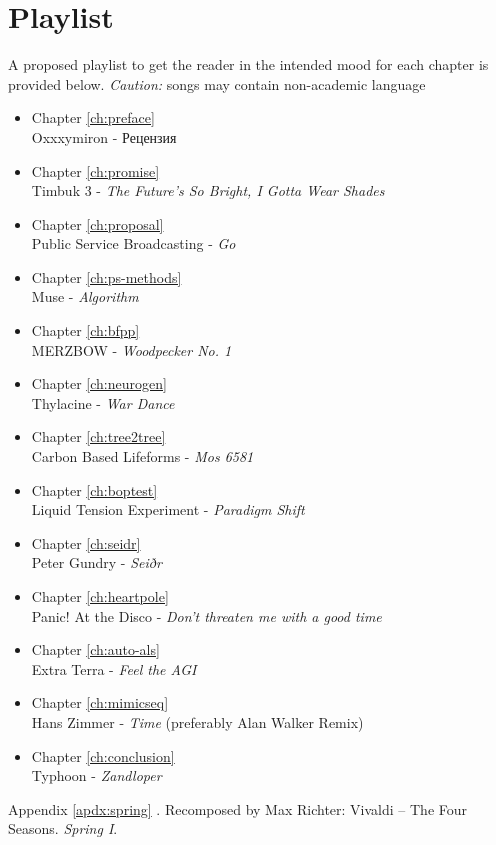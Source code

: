 \chapter{Playlist}
\label{apdx:playlist}

A proposed playlist to get the reader in the intended mood for each chapter is provided below.
\emph{Caution:} songs may contain non-academic language

\begin{itemize}
    \item Chapter \ref{ch:preface}  \\ Oxxxymiron - \foreignlanguage{russian}{Рецензия}
    \item Chapter \ref{ch:promise}  \\ Timbuk 3 - \emph{The Future's So Bright, I Gotta Wear Shades}
    \item Chapter \ref{ch:proposal}  \\ Public Service Broadcasting - \emph{Go}
    \item Chapter \ref{ch:ps-methods}  \\ Muse - \emph{Algorithm}
    \item Chapter \ref{ch:bfpp}  \\ MERZBOW - \emph{Woodpecker No. 1} 
    \item Chapter \ref{ch:neurogen}  \\ Thylacine - \emph{War Dance}
    \item Chapter \ref{ch:tree2tree}  \\ Carbon Based Lifeforms - \emph{Mos 6581}
    \item Chapter \ref{ch:boptest}  \\ Liquid Tension Experiment - \emph{Paradigm Shift}
    \item Chapter \ref{ch:seidr}  \\ Peter Gundry - \emph{Seiðr}
    \item Chapter \ref{ch:heartpole}  \\ Panic! At the Disco - \emph{Don't threaten me with a good time}
    \item Chapter \ref{ch:auto-als}  \\ Extra Terra - \emph{Feel the AGI} 
    \item Chapter \ref{ch:mimicseq}  \\ Hans Zimmer - \emph{Time} (preferably Alan Walker Remix)
    \item Chapter \ref{ch:conclusion}  \\ Typhoon - \emph{Zandloper}
\end{itemize}

Appendix \ref{apdx:spring} . Recomposed by Max Richter: Vivaldi – The Four Seasons. \emph{Spring I}.